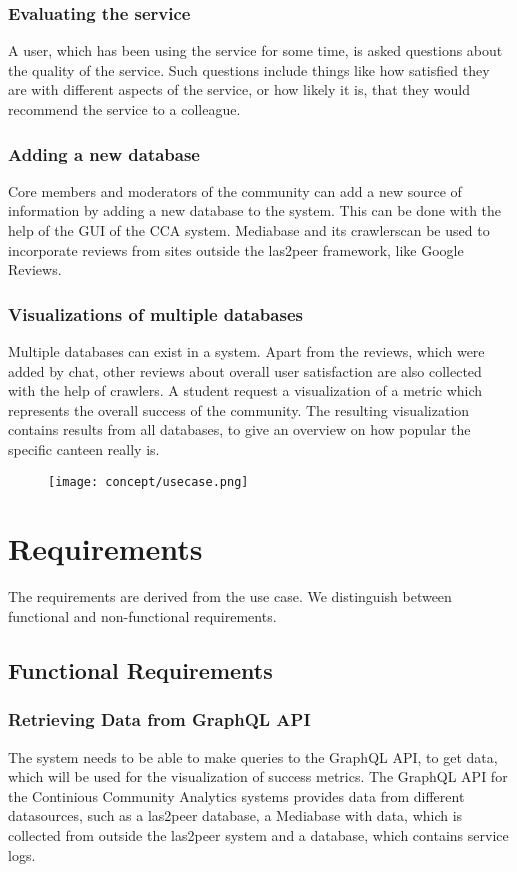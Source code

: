 \subsubsection{Evaluating the service} A user, which has been using the service for some time, is asked questions about the quality of the service. Such questions include things like how satisfied they are with different aspects of the service, or how likely it is, that they would recommend the service to a colleague.

\subsubsection{Adding a new database} Core members and moderators of the community can add a new source of information by adding a new database to the system. This can be done with the help of the GUI of the CCA system. Mediabase and its crawlerscan be used to incorporate reviews from sites outside the las2peer framework, like Google Reviews.

\subsubsection{Visualizations of multiple databases} Multiple databases can exist in a system. Apart from the reviews, which were added by chat, other reviews about overall user satisfaction are also collected with the help of crawlers. A student request a visualization of a metric which represents the overall success of the community. The resulting visualization contains results from all databases, to give an overview on how popular the specific canteen really is.

\begin{figure}
    \centering
    \texttt{[image: concept/usecase.png]}
\end{figure}

\section{Requirements}
The requirements are derived from the use case. We distinguish between functional and non-functional requirements.
\subsection{Functional Requirements}

\subsubsection{Retrieving Data from GraphQL API}
The system needs to be able to make queries to the GraphQL API, to get data, which will be used for the visualization of success metrics. The GraphQL API  for the Continious Community Analytics systems provides data from different datasources, such as a las2peer database, a Mediabase with data, which is collected from outside the las2peer system and a database, which contains service logs.

